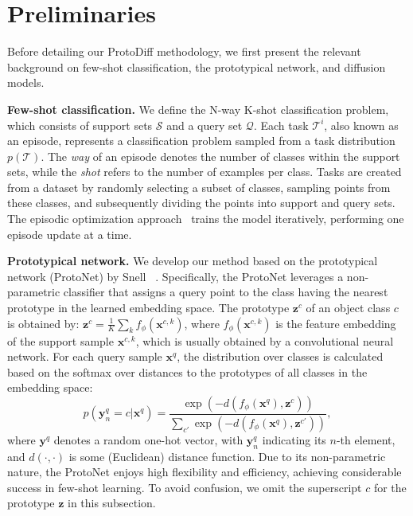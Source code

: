 \section{Preliminaries}

Before detailing our ProtoDiff methodology, we first present the relevant background on few-shot classiﬁcation, the prototypical network, and diffusion models.

\textbf{Few-shot classification.} We define the N-way K-shot classification problem, which consists of support sets $\mathcal{S}$ and a query set $\mathcal{Q}$. Each task $\mathcal{T}^i$, also known as an episode, represents a classification problem sampled from a task distribution $p(\mathcal{T})$. The \textit{way} of an episode denotes the number of classes within the support sets, while the \textit{shot} refers to the number of examples per class. Tasks are created from a dataset by randomly selecting a subset of classes, sampling points from these classes, and subsequently dividing the points into support and query sets. The episodic optimization approach~\cite{vinyals2016matching} trains the model iteratively, performing one episode update at a time.

\textbf{Prototypical network.} We develop our method based on the prototypical network (ProtoNet) by Snell \etal~\cite{snell2017prototypical}. Specifically, the ProtoNet leverages a non-parametric classifier that assigns a query point to the class having the nearest prototype in the learned embedding space. The prototype $\mathbf{z}^c$ of an object class $c$ is obtained by: $\mathbf{z}^c {=} \frac{1}{K}\sum_k f_{\phi}(\mathbf{x}^{c,k})$, where $f_{\phi}(\mathbf{x}^{c,k})$ is the feature embedding of the support sample $\mathbf{x}^{c,k}$, which is usually obtained by a convolutional neural network. For each query sample $\mathbf{x}^q$, the distribution over classes is calculated based on the softmax over distances to the prototypes of all classes in the embedding space:
\begin{equation}
\label{eqn:protonetProb}
    p(\mathbf{y}_{n}^q = c|\mathbf{x}^q) = \frac{\exp(-d(f_{\phi}(\mathbf{x}^q),\mathbf{z}^c))}{\sum_{c'} \exp(-d(f_{\phi}(\mathbf{x}^q),\mathbf{z}^{c'}))},
\end{equation}
where $\mathbf{y}^q$ denotes a random one-hot vector, with $\mathbf{y}_n^q$ indicating its $n$-th element, and $d(\cdot,\cdot)$ is some (Euclidean) distance function. Due to its non-parametric nature, the ProtoNet enjoys high flexibility and efficiency, achieving considerable success in few-shot learning.  To avoid confusion, we omit the superscript $c$ for the prototype $\mathbf{z}$ in this subsection.

